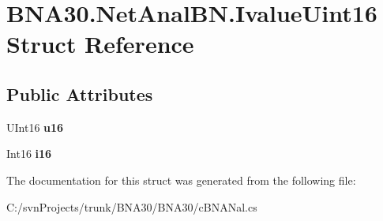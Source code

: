 \hypertarget{struct_b_n_a30_1_1_net_anal_b_n_1_1_ivalue_uint16}{}\section{B\+N\+A30.\+Net\+Anal\+B\+N.\+Ivalue\+Uint16 Struct Reference}
\label{struct_b_n_a30_1_1_net_anal_b_n_1_1_ivalue_uint16}
\subsection*{Public Attributes}
\begin{DoxyCompactItemize}
\item 
\mbox{\label{struct_b_n_a30_1_1_net_anal_b_n_1_1_ivalue_uint16_afe97c482474be2b69633649f19d2c60f}} 
U\+Int16 {\bfseries u16}
\item 
\mbox{\label{struct_b_n_a30_1_1_net_anal_b_n_1_1_ivalue_uint16_a70e7c154d7fd92305211520118db82f5}} 
Int16 {\bfseries i16}
\end{DoxyCompactItemize}


The documentation for this struct was generated from the following file\+:\begin{DoxyCompactItemize}
\item 
C\+:/svn\+Projects/trunk/\+B\+N\+A30/\+B\+N\+A30/c\+B\+N\+A\+Nal.\+cs\end{DoxyCompactItemize}
